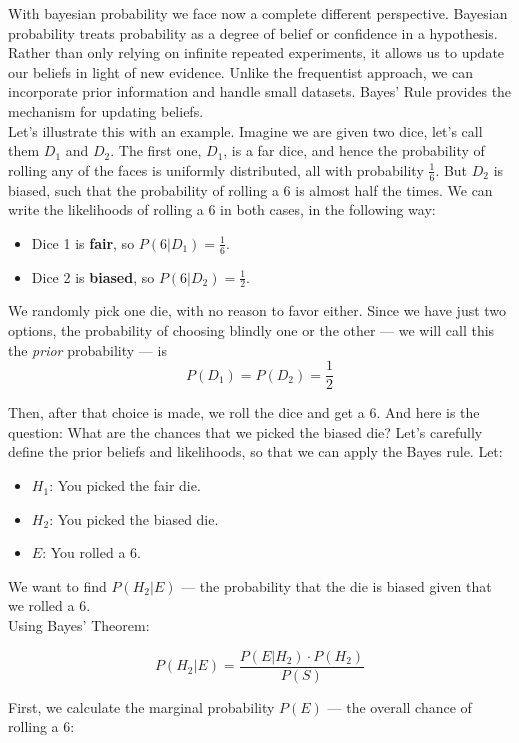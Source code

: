 \documentclass{book}
\begin{document}
With bayesian probability we face now a complete different perspective. Bayesian probability treats probability as a degree of belief or confidence in a hypothesis. Rather than only relying on infinite repeated experiments, it allows us to update our beliefs in light of new evidence. Unlike the frequentist approach, we can incorporate prior information and handle small datasets. Bayes’ Rule provides the mechanism for updating beliefs.\\

Let's illustrate this with an example. Imagine we are given two dice, let's call them $D_1$ and $D_2$. The first one, $D_1$, is a far dice, and hence the probability of rolling any of the faces is uniformly distributed, all with probability $\frac{1}{6}$. But $D_2$ is biased, such that the probability of rolling a 6 is almost half the times. We can write the likelihoods of rolling a 6 in both cases, in the following way:
\begin{itemize}
  \item Dice 1 is \textbf{fair}, so $P(6|D_1) = \frac{1}{6}$.
  \item Dice 2 is \textbf{biased}, so $P(6|D_2) = \frac{1}{2}$.
\end{itemize}

We randomly pick one die, with no reason to favor either. Since we have just two options, the probability of choosing blindly one or the other — we will call this the \textit{prior} probability — is
\[
P(D_1) = P(D_2) = \frac{1}{2}
\]

Then, after that choice is made, we roll the dice and get a 6. And here is the question: What are the chances that we picked the biased die? Let's carefully define the prior beliefs and likelihoods, so that we can apply the Bayes rule. Let:

\begin{itemize}
  \item $H_1$: You picked the fair die.
  \item $H_2$: You picked the biased die.
  \item $E$: You rolled a 6.
\end{itemize}

We want to find $P(H_2 | E)$ — the probability that the die is biased given that we rolled a 6.\\

Using Bayes’ Theorem:

\[
P(H_2 | E) = \frac{P(E | H_2) \cdot P(H_2)}{P(S)}
\]

First, we calculate the marginal probability $P(E)$ — the overall chance of rolling a 6:
\end{document}
